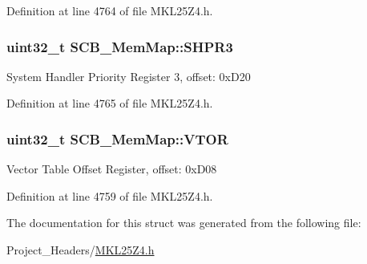 Definition at line 4764 of file M\+K\+L25\+Z4.\+h.

\subsubsection[{\texorpdfstring{S\+H\+P\+R3}{SHPR3}}]{\setlength{\rightskip}{0pt plus 5cm}uint32\+\_\+t S\+C\+B\+\_\+\+Mem\+Map\+::\+S\+H\+P\+R3}\hypertarget{struct_s_c_b___mem_map_a8ac3a3b8dd23fb279640b98a95fb796a}{}\label{struct_s_c_b___mem_map_a8ac3a3b8dd23fb279640b98a95fb796a}
System Handler Priority Register 3, offset\+: 0x\+D20 

Definition at line 4765 of file M\+K\+L25\+Z4.\+h.

\subsubsection[{\texorpdfstring{V\+T\+OR}{VTOR}}]{\setlength{\rightskip}{0pt plus 5cm}uint32\+\_\+t S\+C\+B\+\_\+\+Mem\+Map\+::\+V\+T\+OR}\hypertarget{struct_s_c_b___mem_map_aa327db1d9948595498fba43acc8d336b}{}\label{struct_s_c_b___mem_map_aa327db1d9948595498fba43acc8d336b}
Vector Table Offset Register, offset\+: 0x\+D08 

Definition at line 4759 of file M\+K\+L25\+Z4.\+h.



The documentation for this struct was generated from the following file\+:\begin{DoxyCompactItemize}
\item 
Project\+\_\+\+Headers/\hyperlink{_m_k_l25_z4_8h}{M\+K\+L25\+Z4.\+h}\end{DoxyCompactItemize}
